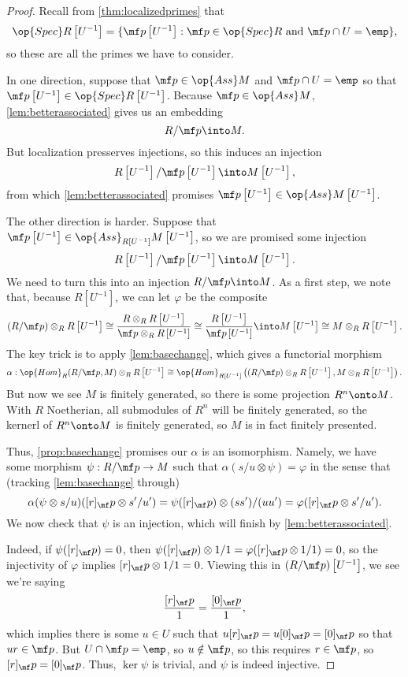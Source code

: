 \begin{proof}
	Recall from \autoref{thm:localizedprimes} that
	\[\op{Spec}R\left[U^{-1}\right]=\{\mf p\left[U^{-1}\right]:\mf p\in\op{Spec}R\text{ and }\mf p\cap U=\emp\},\]
	so these are all the primes we have to consider.
	
	In one direction, suppose that $\mf p\in\op{Ass}M$ and $\mf p\cap U=\emp$ so that $\mf p\left[U^{-1}\right]\in\op{Spec}R\left[U^{-1}\right]$. Because $\mf p\in\op{Ass}M$, \autoref{lem:betterassociated} gives us an embedding
	\[R/\mf p\into M.\]
	But localization presserves injections, so this induces an injection
	\[R\left[U^{-1}\right]/\mf p\left[U^{-1}\right]\into M\left[U^{-1}\right],\]
	from which \autoref{lem:betterassociated} promises $\mf p\left[U^{-1}\right]\in\op{Ass}M\left[U^{-1}\right]$.

	The other direction is harder. Suppose that $\mf p\left[U^{-1}\right]\in\op{Ass}_{R\left[U^{-1}\right]}M\left[U^{-1}\right]$, so we are promised some injection
	\[R\left[U^{-1}\right]/\mf p\left[U^{-1}\right]\into M\left[U^{-1}\right].\]
	We need to turn this into an injection $R/\mf p\into M$. As a first step, we note that, because $R\left[U^{-1}\right]$, we can let $\varphi$ be the composite
	\[(R/\mf p)\otimes_RR\left[U^{-1}\right]\cong\frac{R\otimes_RR\left[U^{-1}\right]}{\mf p\otimes_RR\left[U^{-1}\right]}\cong\frac{R\left[U^{-1}\right]}{\mf p\left[U^{-1}\right]}\into M\left[U^{-1}\right]\cong M\otimes_RR\left[U^{-1}\right].\]
	The key trick is to apply \autoref{lem:basechange}, which gives a functorial morphism
	\[\alpha:\op{Hom}_R(R/\mf p,M)\otimes_RR\left[U^{-1}\right]\cong\op{Hom}_{R\left[U^{-1}\right]}\left((R/\mf p)\otimes_RR\left[U^{-1}\right],M\otimes_RR\left[U^{-1}\right]\right).\]
	But now we see $M$ is finitely generated, so there is some projection $R^n\onto M$. With $R$ Noetherian, all submodules of $R^n$ will be finitely generated, so the kernerl of $R^n\onto M$ is finitely generated, so $M$ is in fact finitely presented.
	
	Thus, \autoref{prop:basechange} promises our $\alpha$ is an isomorphism. Namely, we have some morphism $\psi:R/\mf p\to M$ such that $\alpha(s/u\otimes\psi)=\varphi$ in the sense that (tracking \autoref{lem:basechange} through)
	\[\alpha(\psi\otimes s/u)([r]_\mf p\otimes s'/u')=\psi([r]_\mf p)\otimes(ss')/(uu')=\varphi([r]_\mf p\otimes s'/u').\]
	We now check that $\psi$ is an injection, which will finish by \autoref{lem:betterassociated}.
	
	Indeed, if $\psi([r]_\mf p)=0$, then $\psi([r]_\mf p)\otimes1/1=\varphi([r]_\mf p\otimes1/1)=0$, so the injectivity of $\varphi$ implies $[r]_\mf p\otimes1/1=0$. Viewing this in $(R/\mf p)\left[U^{-1}\right]$, we see we're saying
	\[\frac{[r]_\mf p}1=\frac{[0]_\mf p}1,\]
	which implies there is some $u\in U$ such that $u[r]_\mf p=u[0]_\mf p=[0]_\mf p$ so that $ur\in\mf p$. But $U\cap\mf p=\emp$, so $u\notin\mf p$, so this requires $r\in\mf p$, so $[r]_\mf p=[0]_\mf p$. Thus, $\ker\psi$ is trivial, and $\psi$ is indeed injective.
\end{proof}
